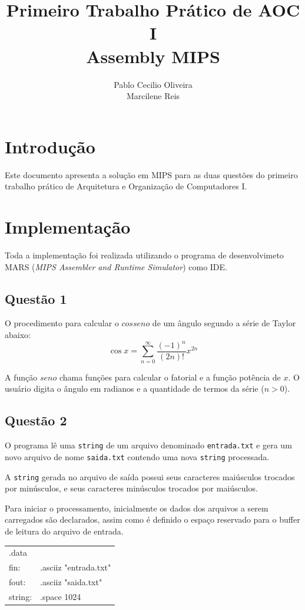 \documentclass[12pt,a4paper]{article}
\author{Pablo Cecilio Oliveira\\
Marcilene Reis}
\title{Primeiro Trabalho Prático de AOC I\\
Assembly MIPS}
\date{}
\numberwithin{figure}{subsection}
\numberwithin{table}{subsection}
\begin{document}
\maketitle

\section{Introdução}

Este documento apresenta a solução em MIPS para as duas questões do primeiro trabalho prático de Arquitetura e Organização de Computadores I.

\section{Implementação}

Toda a implementação foi realizada utilizando o programa de desenvolvimeto MARS (\textit{MIPS Assembler and Runtime Simulator}) como IDE.

\subsection{Questão 1}

O procedimento para calcular o $cosseno$ de um ângulo segundo a série de Taylor abaixo:
\[ \cos x = \sum_{n=0}^{\infty} \frac{(-1)^n}{(2n)!} x^{2n} \]

A função $seno$ chama funções para calcular o fatorial e a função potência de $x$. O usuário digita o ângulo em radianos e a quantidade de termos da série ($n>0$).

\subsection{Questão 2}

O programa lê uma \texttt{string} de um arquivo denominado \texttt{entrada.txt} e gera um novo arquivo de nome \texttt{saida.txt} contendo uma nova \texttt{string} processada. 

A \texttt{string} gerada no arquivo de saída possui seus caracteres maiúsculos trocados por minúsculos, e seus  caracteres minúsculos trocados por maiúsculos.

Para iniciar o processamento, inicialmente os dados dos arquivos a serem carregados são declarados, assim como é definido o espaço reservado para o buffer de leitura do arquivo de entrada.

\begin{table}[H]
	\begin{tabular}{>{\ttfamily}l>{\ttfamily}l}
	.data   & \\
	fin:	& .asciiz "entrada.txt" \\
	fout:	& .asciiz "saida.txt" \\
	string:	& .space 1024 \\
	\end{tabular}
\end{table}
\end{document}
